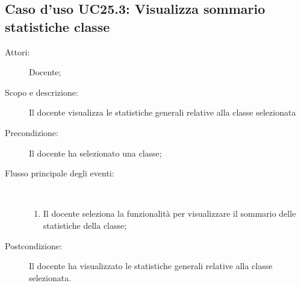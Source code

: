 \subsection{Caso d'uso UC25.3: Visualizza sommario statistiche classe}\begin{description}
	\item[Attori:] Docente;
	\item[Scopo e descrizione:] Il docente visualizza le statistiche generali relative alla classe selezionata
	\item[Precondizione:] Il docente ha selezionato una classe;
	
	\item[Flusso principale degli eventi:] \ 
	\begin{enumerate}
		\item Il docente seleziona la funzionalità per visualizzare il sommario delle statistiche della classe;
		
	\end{enumerate}
	\item[Postcondizione:] Il docente ha visualizzato le statistiche generali relative alla classe selezionata.
\end{description}
\hypertarget{UC25.4}{}
